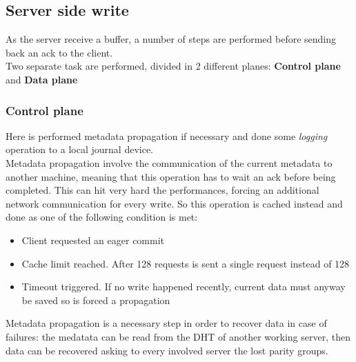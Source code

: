 \subsection{Server side write}
As the server receive a buffer, a number of steps are performed before sending
back an ack to the client. \\ Two separate task are performed, divided in 2
different planes: \textbf{Control plane} and \textbf{Data plane}

\subsubsection*{Control plane}
Here is performed metadata propagation if necessary and done some
\textit{logging} operation to a local journal device. \\ Metadata propagation
involve the communication of the current metadata to another machine, meaning
that this operation has to wait an ack before being completed.  This can hit
very hard the performances, forcing an additional network communication for
every write. So this operation is cached instead and done as one of the
following condition is met:
\begin{itemize}
    \item Client requested an eager commit
    \item Cache limit reached. After 128 requests is sent a single request
        instead of 128
    \item Timeout triggered. If no write happened recently, current
        data must anyway be saved so is forced a propagation
\end{itemize}
Metadata propagation is a necessary step in order to recover data in case of
failures: the medatata can be read from the DHT of another working server, then
data can be recovered asking to every involved server the lost parity groups.

